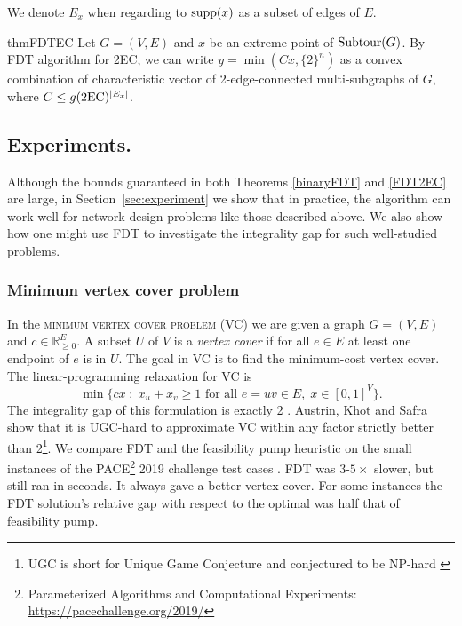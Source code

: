 We denote $E_x$ when regarding to $\operatorname{supp}(x)$ as a subset of edges of $E$.

\begin{restatable}{thm}{FDTEC}
	\label{FDT2EC}
	Let $G=(V,E)$ and $x$ be an extreme point of  $\operatorname{{Subtour}}(G)$. By FDT algorithm for 2EC, we can write $y= \min(Cx,\{2\}^n)$ as a convex combination of characteristic vector of 2-edge-connected multi-subgraphs of $G$, where $C\leq g(\2ec)^{|E_x|}$.
\end{restatable}

\subsection{Experiments.} Although the bounds guaranteed in both Theorems \ref{binaryFDT} and \ref{FDT2EC} are large, in Section~\ref{sec:experiment} we show that in practice, the algorithm can work well for network design problems like those described above. We also show how one might use FDT to investigate the integrality gap for such well-studied problems.




\subsubsection{Minimum vertex cover problem}

In the \textsc{minimum vertex cover problem (VC)} we are given a graph $G=(V,E)$ and $c\in \mathbb{R}^E_{\geq 0}$. A subset $U$ of $V$ is a \textit{vertex cover} if for all $e\in E$ at least one endpoint of $e$ is in $U$. The goal in VC is to find the minimum-cost vertex cover. The linear-programming relaxation for VC is
\begin{equation}
\min \{cx \; : \; x_u + x_v \geq	 1 \text{ for all } e=uv \in E, \; x\in [0,1]^{V}\}.
\end{equation}
The integrality gap of this formulation is exactly 2 \cite{davids}. Austrin, Khot and Safra~\cite{UGhardVC} show that it is UGC-hard to approximate VC within any factor strictly better than 2\footnote{UGC is short for Unique Game Conjecture and conjectured to be NP-hard \cite{Khot2002OnTP}}. We compare  FDT and the feasibility pump heuristic \cite{fp1} on the small instances of the PACE\footnote{ Parameterized Algorithms and Computational Experiments: \url{https://pacechallenge.org/2019/}} 2019 challenge test cases \cite{PACE}. FDT was $3$-$5\times$ slower, but still ran in seconds. It always gave a better vertex cover. For some instances the FDT solution's relative gap with respect to the optimal was half that of feasibility pump.

